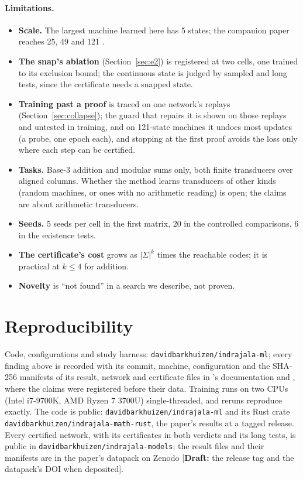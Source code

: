 \documentclass[11pt]{article}
\newcommand{\draftnote}[1]{\textcolor{red!70!black}{[\textbf{Draft:} #1]}}
\begin{document}
\paragraph{Limitations.}
\begin{itemize}
\item \textbf{Scale.} The largest machine learned here has 5 states; the companion paper reaches 25,
  49 and 121 \citep{barkhuizen-2026-certified-modular-division}.
\item \textbf{The snap's ablation} (Section~\ref{sec:e2}) is registered at two cells, one trained
  to its exclusion bound; the continuous state is judged by sampled and long tests, since the
  certificate needs a snapped state.
\item \textbf{Training past a proof} is traced on one network's replays
  (Section~\ref{sec:collapse}); the guard that repairs it is shown on those replays and untested in
  training, and on 121-state machines it undoes most updates (a probe, one epoch each), and
  stopping at the first proof avoids the loss only where each step can be certified.
\item \textbf{Tasks.} Base-3 addition and modular sums only, both finite transducers over aligned
  columns. Whether the method learns transducers of other kinds (random machines, or ones with no
  arithmetic reading) is open; the claims are about arithmetic transducers.
\item \textbf{Seeds.} 5 seeds per cell in the first matrix, 20 in the controlled comparisons, 6 in
  the existence tests.
\item \textbf{The certificate's cost} grows as $|\Sigma|^k$ times the reachable codes; it is
  practical at $k \le 4$ for addition.
\item \textbf{Novelty} is ``not found'' in a search we describe, not proven.
\end{itemize}

\section{Reproducibility}

Code, configurations and study harness: \texttt{davidbarkhuizen/indrajala-ml}; every finding above
is recorded with its commit, machine, configuration and the SHA-256 manifests of its result, network
and certificate files in 's documentation and
, where the claims were registered before their
data. Training runs on two CPUs (Intel i7-9700K, AMD Ryzen 7 3700U) single-threaded, and reruns
reproduce exactly. The code is public: \texttt{davidbarkhuizen/indrajala-ml} and its Rust crate
\texttt{davidbarkhuizen/indrajala-math-rust}, the paper's results at a tagged release. Every
certified network, with its certificates in both verdicts and its long tests, is public in
\texttt{davidbarkhuizen/indrajala-models}; the result files and their manifests are in the paper's
datapack on Zenodo \draftnote{the release tag and the datapack's DOI when deposited}.
\end{document}
